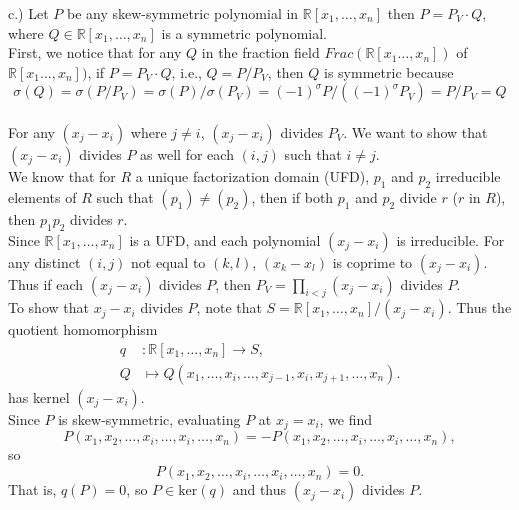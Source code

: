 \documentclass[12pt]{article}
\begin{document}
c.) Let $P$ be any skew-symmetric polynomial in $\mathbb{R}[x_1, \dots, x_n]$ then $P = P_V \cdot Q$, where $Q \in \mathbb{R}[x_1, \dots, x_n]$ is a symmetric polynomial.\\

First, we notice that for any $Q$ in the fraction field $Frac(\mathbb{R}[x_1…, x_n])$ of $\mathbb{R}[x_1…, x_n])$, if $P = P_V\cdot Q$, i.e., $Q = P/P_V$, then $Q$ is symmetric because 
$$\sigma(Q)  = \sigma(P/P_V ) = \sigma(P)/\sigma(P_V) 
= (-1)^\sigma P / ( (-1)^\sigma P_V) = P/P_V = Q$$\\

For any $(x_j - x_i)$ where $j \neq i$, $(x_j - x_i)$ divides $P_V$. 
We want to show that $(x_j - x_i)$ divides $P$ as well for each $(i,j)$ such that $i \neq j$.\\

We know that for $R$ a unique factorization domain (UFD), $p_1$ and $p_2$ irreducible elements of $R$ such that $(p_1) \neq (p_2)$, then if both $p_1$ and $p_2$ divide $r$ ($r$ in $R$), then $p_1p_2$ divides $r$.\\

Since $\mathbb{R}[x_1, \dots, x_n]$ is a UFD, and each polynomial $(x_j - x_i)$ is irreducible. For any distinct $(i, j)$ not equal to $(k, l)$, 
$(x_k - x_l)$ is coprime to $(x_j -x_i)$. Thus if each $(x_j-x_i)$ divides $P$, then $P_V = \prod_{i < j} (x_j - x_i)$ divides $P$. \\


To show that $x_j-x_i$ divides $P$, note that $S = \mathbb{R}[x_1,\dots,x_n]/(x_j-x_i)$. Thus the quotient homomorphism 
\begin{align*}
q &: \mathbb{R}[x_1,\dots,x_n] \longrightarrow S,\\
Q &\mapsto Q(x_1,\dots,x_i,\dots,x_{j-1},x_i,x_{j+1},\dots,x_n).
\end{align*}
has kernel $(x_j - x_i)$.\\

Since $P$ is skew-symmetric, evaluating $P$ at $x_j = x_i$, we find
$$P (x_1, x_2, \dots, x_i, \dots , x_i, \dots, x_n) 
= -P(x_1, x_2, \dots, x_i, \dots, x_i, \dots, x_n),$$
so
$$P(x_1, x_2, \dots, x_i, \dots, x_i, \dots, x_n) =  0.$$
That is, $q(P) = 0$, so $P\in \mathrm{ker}(q)$ and thus $(x_j - x_i)$  divides $P$.\\
\end{document}
